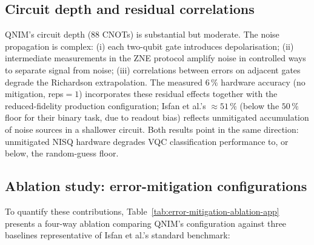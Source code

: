 \documentclass[11pt,a4paper, english]{book}
\theoremstyle{plain}
\theoremstyle{definition}
\numberwithin{equation}{chapter}
\numberwithin{figure}{chapter}
\numberwithin{table}{chapter}
\begin{document}
\subsection{Circuit depth and residual correlations}

QNIM's circuit depth (88 CNOTs) is substantial but moderate. The noise propagation
is complex: (i) each two-qubit gate introduces depolarisation; (ii) intermediate
measurements in the ZNE protocol amplify noise in controlled ways to separate
signal from noise; (iii) correlations between errors on adjacent gates degrade
the Richardson extrapolation. The measured $6\,\%$ hardware accuracy (no
mitigation, reps$=1$) incorporates these residual effects together with the
reduced-fidelity production configuration; Isfan et al.'s $\approx 51\,\%$
(below the $50\,\%$ floor for their binary task, due to readout bias) reflects
unmitigated accumulation of noise sources in a shallower circuit. Both results
point in the same direction: unmitigated NISQ hardware degrades VQC
classification performance to, or below, the random-guess floor.

\subsection{Ablation study: error-mitigation configurations}

To quantify these contributions, Table~\ref{tab:error-mitigation-ablation-app}
presents a four-way ablation comparing QNIM's configuration against three
baselines representative of Isfan et al.'s standard benchmark:
\end{document}
